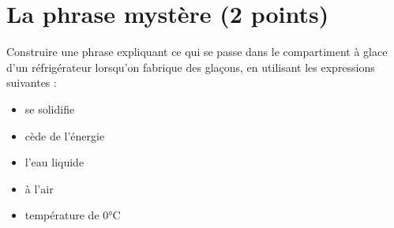 \section{La phrase mystère (2 points)}

Construire une phrase expliquant ce qui se passe dans le compartiment à glace d'un réfrigérateur lorsqu'on fabrique des glaçons, en utilisant les expressions suivantes :

\begin{multicols}{3}
	\begin{itemize}
		\item se solidifie
		\item cède de l'énergie
		\item l'eau liquide
		\item à l'air
		\item température de 0°C
	\end{itemize}
\end{multicols}